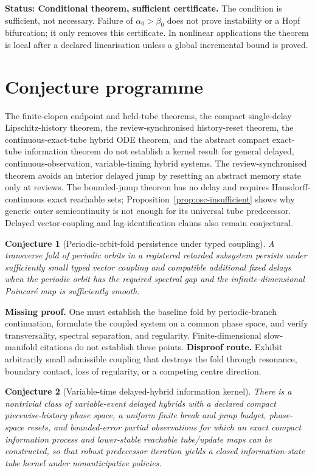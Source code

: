 \documentclass[11pt]{article}
\newtheorem{conjecture}{Conjecture}
\theoremstyle{definition}
\newcommand{\status}[1]{\par\smallskip\noindent\textbf{Status: #1.}\quad}
\begin{document}
\status{Conditional theorem, sufficient certificate} The condition is sufficient, not necessary. Failure of $\alpha_0>\beta_0$ does not prove instability or a Hopf bifurcation; it only removes this certificate. In nonlinear applications the theorem is local after a declared linearisation unless a global incremental bound is proved.

\section{Conjecture programme}

The finite-clopen endpoint and held-tube theorems, the compact single-delay Lipschitz-history theorem, the review-synchronised history-reset theorem, the continuous-exact-tube hybrid ODE theorem, and the abstract compact exact-tube information theorem do not establish a kernel result for general delayed, continuous-observation, variable-timing hybrid systems.  The review-synchronised theorem avoids an interior delayed jump by resetting an abstract memory state only at reviews.  The bounded-jump theorem has no delay and requires Hausdorff-continuous exact reachable sets; Proposition~\ref{prop:osc-insufficient} shows why generic outer semicontinuity is not enough for its universal tube predecessor.  Delayed vector-coupling and lag-identification claims also remain conjectural.

\begin{conjecture}[Periodic-orbit-fold persistence under typed coupling]
A transverse fold of periodic orbits in a registered retarded subsystem persists under sufficiently small typed vector coupling and compatible additional fixed delays when the periodic orbit has the required spectral gap and the infinite-dimensional Poincar\'e map is sufficiently smooth.
\end{conjecture}

\noindent\textbf{Missing proof.} One must establish the baseline fold by periodic-branch continuation, formulate the coupled system on a common phase space, and verify transversality, spectral separation, and regularity. Finite-dimensional slow-manifold citations do not establish these points.  
\textbf{Disproof route.} Exhibit arbitrarily small admissible coupling that destroys the fold through resonance, boundary contact, loss of regularity, or a competing centre direction.

\begin{conjecture}[Variable-time delayed-hybrid information kernel]
There is a nontrivial class of variable-event delayed hybrids with a declared compact piecewise-history phase space, a uniform finite break and jump budget, phase-space resets, and bounded-error partial observations for which an exact compact information process and lower-stable reachable tube/update maps can be constructed, so that robust predecessor iteration yields a closed information-state tube kernel under nonanticipative policies.
\end{conjecture}
\end{document}
